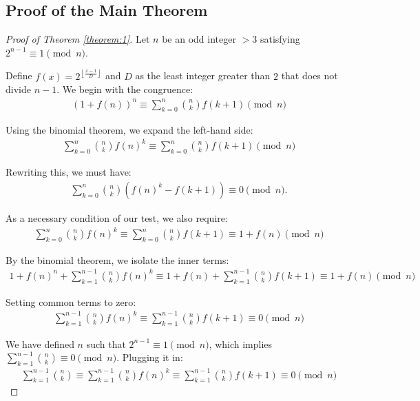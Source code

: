 \documentclass{article}
\theoremstyle{plain}
\theoremstyle{definition}
\begin{document}
\subsection{Proof of the Main Theorem}
\begin{proof}[Proof of Theorem \ref{theorem:1}]
Let \( n \) be an odd integer $>3$ satisfying $2^{n-1} \equiv 1 \pmod{n}$.

Define \( f(x) = 2^{\left\lfloor \frac{x-1}{D} \right\rfloor} \) and \( D \) as the least integer greater than \( 2 \) that does not divide \( n-1 \). We begin with the congruence:
\begin{align}
(1 + f(n))^n \equiv \sum_{k=0}^{n} \binom{n}{k} f(k+1) \pmod{n}
\end{align}

Using the binomial theorem, we expand the left-hand side:
\begin{align}
\sum_{k=0}^{n} \binom{n}{k} f(n)^k \equiv \sum_{k=0}^{n} \binom{n}{k} f(k+1) \pmod{n}
\end{align}

Rewriting this, we must have:
\begin{align}
\sum_{k=0}^{n} \binom{n}{k} \left(f(n)^k - f(k+1)\right) \equiv 0 \pmod{n}.
\end{align}

As a necessary condition of our test, we also require:
\begin{align}
      \sum_{k=0}^{n} \binom{n}{k} f(n)^k \equiv \sum_{k=0}^{n} \binom{n}{k} f(k+1) \equiv 1 + f(n) \pmod{n}
\end{align}

By the binomial theorem, we isolate the inner terms:
\begin{align}
      1 + f(n)^n + \sum_{k=1}^{n-1} \binom{n}{k} f(n)^k \equiv 1 + f(n) + \sum_{k=1}^{n-1} \binom{n}{k} f(k+1) \equiv 1 + f(n) \pmod{n}
\end{align}

Setting common terms to zero:
\begin{align} \label{equation:congruence1}
      \sum_{k=1}^{n-1} \binom{n}{k} f(n)^k \equiv \sum_{k=1}^{n-1} \binom{n}{k} f(k+1) \equiv 0 \pmod{n}
\end{align}

We have defined $n$ such that $2^{n-1} \equiv 1 \pmod{n}$, which implies $\sum_{k=1}^{n-1} \binom{n}{k} \equiv 0 \pmod{n}$. Plugging it in:
\begin{align}
      \sum_{k=1}^{n-1} \binom{n}{k} \equiv \sum_{k=1}^{n-1} \binom{n}{k} f(n)^k \equiv \sum_{k=1}^{n-1} \binom{n}{k} f(k+1) \equiv 0 \pmod{n}
\end{align}


\end{proof}
\end{document}
